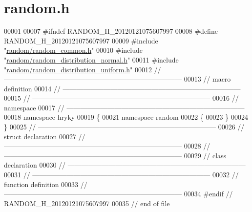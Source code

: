\hypertarget{random_8h_source}{\section{random.\-h}
}

\begin{DoxyCode}
00001 
00007 \textcolor{preprocessor}{#ifndef RANDOM\_H\_20120121075607997}
00008 \textcolor{preprocessor}{}\textcolor{preprocessor}{#define RANDOM\_H\_20120121075607997}
00009 \textcolor{preprocessor}{}\textcolor{preprocessor}{#include "\hyperlink{random__common_8h}{random/random_common.h}"}
00010 \textcolor{preprocessor}{#include "\hyperlink{random__distribution__normal_8h}{random/random_distribution_normal.h}"}
00011 \textcolor{preprocessor}{#include "\hyperlink{random__distribution__uniform_8h}{random/random_distribution_uniform.h}"}
00012 \textcolor{comment}{//
      ------------------------------------------------------------------------------}
00013 \textcolor{comment}{// macro definition}
00014 \textcolor{comment}{//
      ------------------------------------------------------------------------------}
00015 \textcolor{comment}{//
      ------------------------------------------------------------------------------}
00016 \textcolor{comment}{// namespace}
00017 \textcolor{comment}{//
      ------------------------------------------------------------------------------}
00018 \textcolor{keyword}{namespace }hryky
00019 \{
00021 \textcolor{keyword}{namespace }random
00022 \{
00023 \}
00024 \}
00025 \textcolor{comment}{//
      ------------------------------------------------------------------------------}
00026 \textcolor{comment}{// struct declaration}
00027 \textcolor{comment}{//
      ------------------------------------------------------------------------------}
00028 \textcolor{comment}{//
      ------------------------------------------------------------------------------}
00029 \textcolor{comment}{// class declaration}
00030 \textcolor{comment}{//
      ------------------------------------------------------------------------------}
00031 \textcolor{comment}{//
      ------------------------------------------------------------------------------}
00032 \textcolor{comment}{// function definition}
00033 \textcolor{comment}{//
      ------------------------------------------------------------------------------}
00034 \textcolor{preprocessor}{#endif // RANDOM\_H\_20120121075607997}
00035 \textcolor{preprocessor}{}\textcolor{comment}{// end of file}
\end{DoxyCode}
